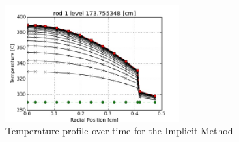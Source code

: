 \begin{figure}[!h]
	\centering
	\includegraphics[width=0.60\textwidth]{images/profile_rod1_level_10_I.jpg}
	\caption{Temperature profile over time for the Implicit Method}
	\label{fig:profile_rod1_level_10_I}
\end{figure}








